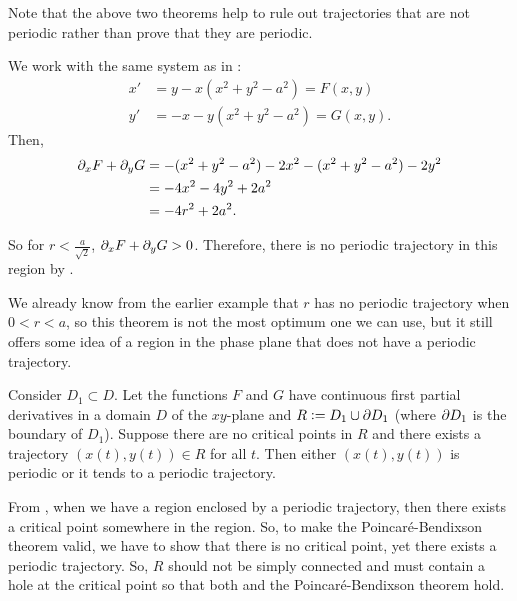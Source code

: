 \begin{remark}
	Note that the above two theorems help to rule out trajectories that are not periodic rather than prove that they are periodic.
\end{remark}

\begin{eg}
	We work with the same system as in :
	\begin{align*}
		x' &= y - x(x^2 + y^2 - a^2) = F(x,y) \\
		y' &= -x - y(x^2 + y^2 - a^2) = G(x,y).
	\end{align*}
	Then, 
	\begin{align*}
		\partial_x F + \partial_y G &= -(x^2 + y^2 - a^2) - 2x^2 - (x^2 + y^2 - a^2) - 2y^2 \\
		&= -4x^2 - 4y^2 + 2a^2 \\
		&= -4r^2 + 2a^2.
	\end{align*}
	
	So for $r < \frac{a}{\sqrt{2}}$, $\partial_x F + \partial_y G > 0$. Therefore, there is no periodic trajectory in this region by .
	
	We already know from the earlier example that $r$ has no periodic trajectory when $0<r<a$, so this theorem is not the most optimum one we can use, but it still offers some idea of a region in the phase plane that does not have a periodic trajectory. 
\end{eg}

\begin{theorem}
	Consider $D_1 \subset D$. Let the functions $F$ and $G$ have continuous first partial derivatives in a domain $D$ of the $xy$-plane and $R := D_1 \cup \partial D_1$ (where $\partial D_1$ is the boundary of $D_1$). Suppose there are no critical points in $R$ and there exists a trajectory $(x(t),y(t)) \in R$ for all $t$. Then either $(x(t),y(t))$ is periodic or it tends to a periodic trajectory.
\end{theorem}

\begin{remark}
	From , when we have a region enclosed by a periodic trajectory, then there exists a critical point somewhere in the region. So, to make the Poincaré-Bendixson theorem valid, we have to show that there is no critical point, yet there exists a periodic trajectory. So, $R$ should not be simply connected and must contain a hole at the critical point so that both  and the Poincaré-Bendixson theorem hold.
\end{remark}

